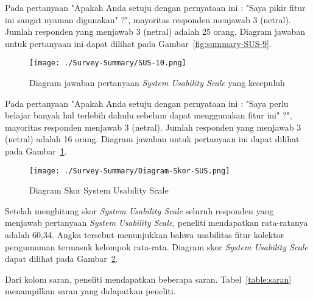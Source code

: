 Pada pertanyaan "Apakah Anda setuju dengan pernyataan ini : "Saya pikir fitur ini sangat nyaman digunakan" ?", mayoritas responden menjawab 3 (netral). Jumlah responden yang menjawab 3 (netral) adalah 25 orang. Diagram jawaban untuk pertanyaan ini dapat dilihat pada Gambar~\ref{fig:summary-SUS-9}.

\begin{figure}[H]
	\centering  
	\texttt{[image: ./Survey-Summary/SUS-10.png]}
	\caption[Diagram jawaban pertanyaan \textit{System Usability Scale} yang kesepuluh]{Diagram jawaban pertanyaan \textit{System Usability Scale} yang kesepuluh}
	\label{fig:summary-SUS-10} 
\end{figure}

Pada pertanyaan "Apakah Anda setuju dengan pernyataan ini : "Saya perlu belajar banyak hal terlebih dahulu sebelum dapat menggunakan fitur ini" ?", mayoritas responden menjawab 3 (netral). Jumlah responden yang menjawab 3 (netral) adalah 16 orang. Diagram jawaban untuk pertanyaan ini dapat dilihat pada Gambar~\ref{fig:summary-SUS-10}.

\begin{figure}[H]
	\centering  
	\texttt{[image: ./Survey-Summary/Diagram-Skor-SUS.png]}
	\caption[Diagram Skor System Usability Scale]{Diagram Skor System Usability Scale} 
	\label{fig:summary-Diagram-Skor-SUS} 
\end{figure}

Setelah menghitung skor \textit{System Usability Scale} seluruh responden yang menjawab pertanyaan \textit{System Usability Scale}, peneliti mendapatkan rata-ratanya adalah 60,34. Angka tersebut menunjukkan bahwa usabilitas fitur kolektor pengumuman termasuk kelompok rata-rata. Diagram skor \textit{System Usability Scale} dapat dilihat pada Gambar~\ref{fig:summary-Diagram-Skor-SUS}. 

Dari kolom saran, peneliti mendapatkan beberapa saran. Tabel~\ref{table:saran} menampilkan saran yang didapatkan peneliti.

